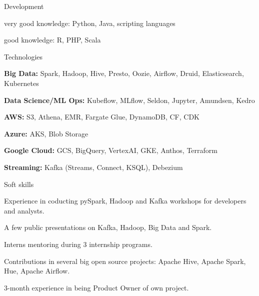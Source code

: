 

\begin{cventries}

  \cventry
    {Development} %
    {} %
    {} %
    {} %
    {
      \begin{cvitems} %
        \item {very good knowledge: Python, Java, scripting languages}
        \item {good knowledge: R, PHP, Scala}
      \end{cvitems}
    }
    
  \cventry
    {Technologies} %
    {} %
    {} %
    {} %
    {
      \begin{cvitems} %
        \item {\textbf{Big Data:} Spark, Hadoop, Hive, Presto, Oozie, Airflow, Druid, Elasticsearch, Kubernetes}
        \item {\textbf{Data Science/ML Ops:} Kubeflow, MLflow, Seldon, Jupyter, Amundsen, Kedro}
        \item {\textbf{AWS:} S3, Athena, EMR, Fargate Glue, DynamoDB, CF, CDK}
        \item {\textbf{Azure:} AKS, Blob Storage}
        \item {\textbf{Google Cloud:} GCS, BigQuery, VertexAI, GKE, Anthos, Terraform}
        \item {\textbf{Streaming:} Kafka (Streams, Connect, KSQL), Debezium}
      \end{cvitems}
    }
    
  \cventry
    {Soft skills} %
    {} %
    {} %
    {} %
    {
      \begin{cvitems} %
        \item {Experience in coducting pySpark, Hadoop and Kafka workshops for developers and analysts.}
        \item {A few public presentations on Kafka, Hadoop, Big Data and Spark.}
        \item {Interns mentoring during 3 internship programs.}
        \item {Contributions in several big open source projects: Apache Hive, Apache Spark, Hue, Apache Airflow.}
        \item{3-month experience in being Product Owner of own project.}
      \end{cvitems}
    }
    

\end{cventries}
